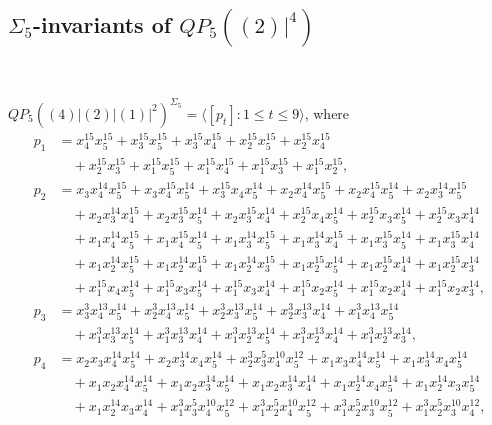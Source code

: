 \documentclass[reqno]{amsart}
\theoremstyle{plain}
\theoremstyle{definition}
\theoremstyle{plain}
\theoremstyle{definition}
\numberwithin{equation}{section}
\begin{document}
\subsection{$\Sigma_5$-invariants of $QP_5((2)|^4)$}\label{s53}\

\medskip
$QP_5((4)|(2)|(1)|^2)^{\Sigma_5} = \langle [p_t] : 1 \leqslant t \leqslant 9 \rangle$, where
\begin{align*}
p_1 &= x_4^{15}x_5^{15} + x_3^{15}x_5^{15} + x_3^{15}x_4^{15} + x_2^{15}x_5^{15} + x_2^{15}x_4^{15}\\ 
&\quad + x_2^{15}x_3^{15} + x_1^{15}x_5^{15} + x_1^{15}x_4^{15} + x_1^{15}x_3^{15} + x_1^{15}x_2^{15},\\
p_2 &= x_3x_4^{14}x_5^{15} + x_3x_4^{15}x_5^{14} + x_3^{15}x_4x_5^{14} + x_2x_4^{14}x_5^{15} + x_2x_4^{15}x_5^{14} + x_2x_3^{14}x_5^{15}\\ &\quad + x_2x_3^{14}x_4^{15} + x_2x_3^{15}x_5^{14} + x_2x_3^{15}x_4^{14} + x_2^{15}x_4x_5^{14} + x_2^{15}x_3x_5^{14} + x_2^{15}x_3x_4^{14}\\ &\quad + x_1x_4^{14}x_5^{15} + x_1x_4^{15}x_5^{14} + x_1x_3^{14}x_5^{15} + x_1x_3^{14}x_4^{15} + x_1x_3^{15}x_5^{14} + x_1x_3^{15}x_4^{14}\\ &\quad + x_1x_2^{14}x_5^{15} + x_1x_2^{14}x_4^{15} + x_1x_2^{14}x_3^{15} + x_1x_2^{15}x_5^{14} + x_1x_2^{15}x_4^{14} + x_1x_2^{15}x_3^{14}\\ &\quad + x_1^{15}x_4x_5^{14} + x_1^{15}x_3x_5^{14} + x_1^{15}x_3x_4^{14} + x_1^{15}x_2x_5^{14} + x_1^{15}x_2x_4^{14} + x_1^{15}x_2x_3^{14},\\
p_3 &= x_3^{3}x_4^{13}x_5^{14} + x_2^{3}x_4^{13}x_5^{14} + x_2^{3}x_3^{13}x_5^{14} + x_2^{3}x_3^{13}x_4^{14} + x_1^{3}x_4^{13}x_5^{14}\\ &\quad + x_1^{3}x_3^{13}x_5^{14} + x_1^{3}x_3^{13}x_4^{14} + x_1^{3}x_2^{13}x_5^{14} + x_1^{3}x_2^{13}x_4^{14} + x_1^{3}x_2^{13}x_3^{14},\\
p_4 &= x_2x_3x_4^{14}x_5^{14} + x_2x_3^{14}x_4x_5^{14} + x_2^{3}x_3^{5}x_4^{10}x_5^{12} + x_1x_3x_4^{14}x_5^{14} + x_1x_3^{14}x_4x_5^{14}\\ &\quad + x_1x_2x_4^{14}x_5^{14} + x_1x_2x_3^{14}x_5^{14} + x_1x_2x_3^{14}x_4^{14} + x_1x_2^{14}x_4x_5^{14} + x_1x_2^{14}x_3x_5^{14}\\ &\quad + x_1x_2^{14}x_3x_4^{14} + x_1^{3}x_3^{5}x_4^{10}x_5^{12} + x_1^{3}x_2^{5}x_4^{10}x_5^{12} + x_1^{3}x_2^{5}x_3^{10}x_5^{12} + x_1^{3}x_2^{5}x_3^{10}x_4^{12},\\

\end{align*}
\end{document}
